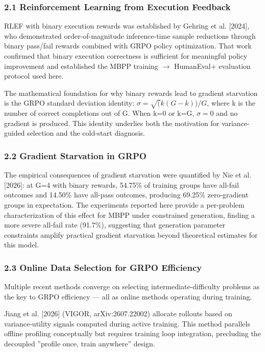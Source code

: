 
\subsubsection{2.1 Reinforcement Learning from Execution Feedback}

RLEF with binary execution rewards was established by Gehring et al. [2024], who demonstrated order-of-magnitude inference-time sample reductions through binary pass/fail rewards combined with GRPO policy optimization. That work confirmed that binary execution correctness is sufficient for meaningful policy improvement and established the MBPP training $\rightarrow$ HumanEval+ evaluation protocol used here.

The mathematical foundation for why binary rewards lead to gradient starvation is the GRPO standard deviation identity: $\sigma = \sqrt(k(G-k))/G$, where k is the number of correct completions out of G. When k=0 or k=G, $\sigma =0$ and no gradient is produced. This identity underlies both the motivation for variance-guided selection and the cold-start diagnosis.

\subsubsection{2.2 Gradient Starvation in GRPO}

The empirical consequences of gradient starvation were quantified by Nie et al. [2026]: at G=4 with binary rewards, 54.75\% of training groups have all-fail outcomes and 14.50\% have all-pass outcomes, producing 69.25\% zero-gradient groups in expectation. The experiments reported here provide a per-problem characterization of this effect for MBPP under constrained generation, finding a more severe all-fail rate (91.7\%), suggesting that generation parameter constraints amplify practical gradient starvation beyond theoretical estimates for this model.

\subsubsection{2.3 Online Data Selection for GRPO Efficiency}

Multiple recent methods converge on selecting intermediate-difficulty problems as the key to GRPO efficiency --- all as online methods operating during training.

Jiang et al. [2026] (VIGOR, arXiv:2607.22002) allocate rollouts based on variance-utility signals computed during active training. This method parallels offline profiling conceptually but requires training loop integration, precluding the decoupled ''profile once, train anywhere'' design.

